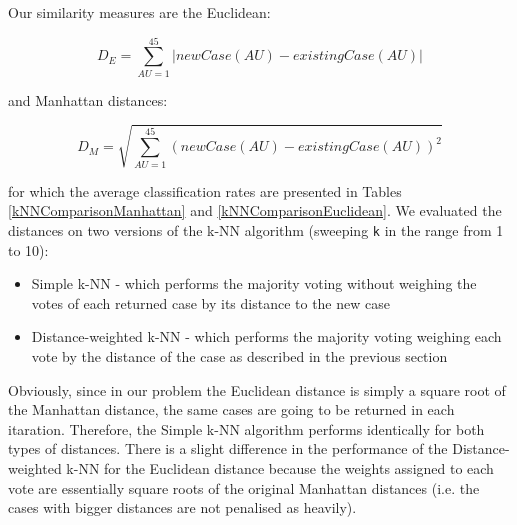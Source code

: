 \documentclass[a4paper]{article}
\begin{document}
Our similarity measures are the Euclidean:

\begin{equation}
D_E = \sum_{AU = 1}^{45} \left | newCase(AU) - existingCase(AU)\right |
\end{equation}

and Manhattan distances:

\begin{equation}
D_M = \sqrt{ \sum_{AU = 1}^{45} \left ( newCase(AU) - existingCase(AU)\right )^{2} }
\end{equation}

for which the average classification rates are presented in Tables \ref{kNNComparisonManhattan} and \ref{kNNComparisonEuclidean}. We evaluated the distances on two versions of the k-NN algorithm (sweeping \texttt{k} in the range from 1 to 10):
\begin{itemize}
\item Simple k-NN - which performs the majority voting without weighing the votes of each returned case by its distance to the new case
\item Distance-weighted k-NN - which performs the majority voting weighing each vote by the distance of the case as described in the previous section
\end{itemize}

Obviously, since in our problem the Euclidean distance is simply a square root of the Manhattan distance, the same cases are going to be returned in each itaration. Therefore, the Simple k-NN algorithm performs identically for both types of distances. There is a slight difference in the performance of the Distance-weighted k-NN for the Euclidean distance because the weights assigned to each vote are essentially square roots of the original Manhattan distances (i.e. the cases with bigger distances are not penalised as heavily).
\end{document}
